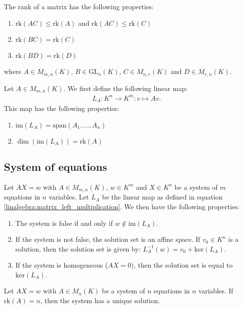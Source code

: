     \begin{property}\label{linalgebra:rank_properties}
        The rank of a matrix has the following properties:
        \begin{enumerate}
            \item $\text{rk}(AC)\leq\text{rk}(A)$ and $\text{rk}(AC)\leq\text{rk}(C)$
            \item $\text{rk}(BC)=\text{rk}(C)$
            \item $\text{rk}(BD)=\text{rk}(D)$
        \end{enumerate}
        where $A\in M_{m,n}(K)$, $B\in\text{GL}_n(K)$, $C\in M_{n,r}(K)$ and $D\in M_{r,n}(K)$.
    \end{property}
    \begin{property}\label{linalgebra:dim_matrix_left_multiplication}
        Let $A\in M_{m,n}(K)$. We first define the following linear map:
        \begin{gather}
            \label{linalgebra:matrix_left_multiplication}
            L_A:K^n\rightarrow K^m:v\mapsto Av.
        \end{gather}
        This map has the following properties:
        \begin{enumerate}
            \item $\text{im}(L_A) = \text{span}(A_1,\ldots,A_n)$
            \item $\dim(\text{im}(L_A))=\text{rk}(A)$
        \end{enumerate}
    \end{property}

\subsection{System of equations}

    \begin{property}\label{linalgebra:matrix_and_equations}
        Let $AX=w$ with $A\in M_{m,n}(K)$, $w\in K^m$ and $X\in K^n$ be a system of $m$ equations in $n$ variables. Let $L_A$ be the linear map as defined in equation \ref{linalgebra:matrix_left_multiplication}. We then have the following properties:
        \begin{enumerate}
            \item The system is false if and only if $w\not\in\text{im}(L_A)$.
            \item If the system is not false, the solution set is an affine space. If $v_0\in K^n$ is a solution, then the solution set is given by: $L_A^{-1}(w)=v_0+\text{ker}(L_A)$.
            \item If the system is homogeneous ($AX=0$), then the solution set is equal to $\text{ker}(L_A)$.
        \end{enumerate}
    \end{property}
    \begin{property}[Uniqueness]\label{linalgebra:rank_unique_solution}
        Let $AX=w$ with $A\in M_n(K)$ be a system of $n$ equations in $n$ variables. If $\text{rk}(A)=n$, then the system has a unique solution.
    \end{property}

